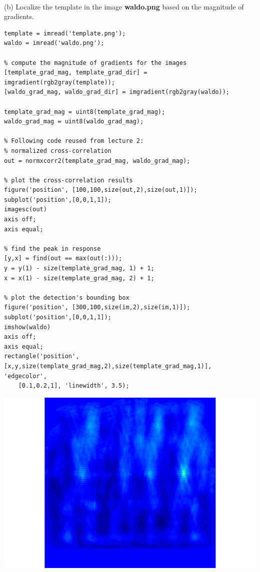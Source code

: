 \documentclass[11pt]{article}
\begin{document}
\\
(b) Localize the template in the image \textbf{waldo.png} based on the magnitude of gradients.
\begin{lstlisting}
template = imread('template.png');
waldo = imread('waldo.png');

% compute the magnitude of gradients for the images
[template_grad_mag, template_grad_dir] = imgradient(rgb2gray(template));
[waldo_grad_mag, waldo_grad_dir] = imgradient(rgb2gray(waldo));

template_grad_mag = uint8(template_grad_mag);
waldo_grad_mag = uint8(waldo_grad_mag);

% Following code reused from lecture 2:
% normalized cross-correlation
out = normxcorr2(template_grad_mag, waldo_grad_mag);

% plot the cross-correlation results
figure('position', [100,100,size(out,2),size(out,1)]);
subplot('position',[0,0,1,1]);
imagesc(out)
axis off;
axis equal;

% find the peak in response
[y,x] = find(out == max(out(:)));
y = y(1) - size(template_grad_mag, 1) + 1;
x = x(1) - size(template_grad_mag, 2) + 1;

% plot the detection's bounding box
figure('position', [300,100,size(im,2),size(im,1)]);
subplot('position',[0,0,1,1]);
imshow(waldo)
axis off;
axis equal;
rectangle('position', [x,y,size(template_grad_mag,2),size(template_grad_mag,1)], 'edgecolor',
	[0.1,0.2,1], 'linewidth', 3.5);
\end{lstlisting}
\includegraphics[scale=0.5]{normxcorrWaldo}
\clearpage
\end{document}
